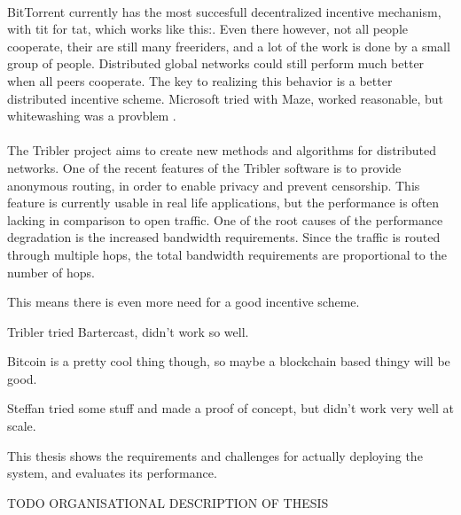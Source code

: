 \\
BitTorrent \cite{} currently has the most succesfull decentralized  incentive mechanism, with tit for tat, which works like this:. Even there however, not all people cooperate, their are still many freeriders, and a lot of the work is done by a small group of people. 
Distributed global networks could still perform much better when all peers cooperate. The key to realizing this behavior is a better distributed incentive scheme.
Microsoft tried with Maze, worked reasonable, but whitewashing was a provblem \cite{yang2005empirical}.\\
\\
The Tribler project aims to create new methods and algorithms for distributed networks. One of the recent features of the Tribler software is to provide anonymous routing, in order to enable privacy and prevent censorship. This feature is currently usable in real life applications, but the performance is often lacking in comparison to open traffic. One of the root causes of the performance degradation is the increased bandwidth requirements. Since the traffic is routed through multiple hops, the total bandwidth requirements are proportional to the number of hops.  

This means there is even more need for a good incentive scheme.

Tribler tried Bartercast, didn't work so well.


Bitcoin is a pretty cool thing though, so maybe a blockchain based thingy will be good.

Steffan tried some stuff and made a proof of concept, but didn't work very well at scale.

This thesis shows the requirements and challenges for actually deploying the system, and evaluates its performance.



TODO ORGANISATIONAL DESCRIPTION OF THESIS

